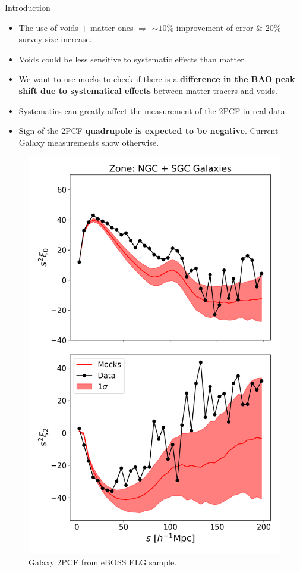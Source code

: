 \documentclass{beamer}
\begin{document}
\begin{frame}[allowframebreaks]{Introduction}
\begin{itemize}
	\item The use of voids + matter ones $\Rightarrow$ $\sim10\%$ improvement of error \& 20\% survey size increase.
	\item Voids could be less sensitive to systematic effects than matter.
	\item We want to use mocks to check if there is a \textbf{difference in the BAO peak shift due to systematical effects} between matter tracers and voids.
	\item Systematics can greatly affect the measurement of the 2PCF in real data.
	\item Sign of the 2PCF \textbf{quadrupole is expected to be negative}. Current Galaxy measurements show otherwise.
\end{itemize}
\pagebreak
\begin{multicols}{2}
\begin{figure}
	\centering
	\includegraphics[width=0.7\linewidth]{plots/gal_CBZ}
	\caption{Galaxy 2PCF from eBOSS ELG sample.}
	\label{fig:galcbz}
\end{figure}
\begin{figure}
	\centering

\end{figure}
\end{multicols}
\end{frame}
\end{document}
